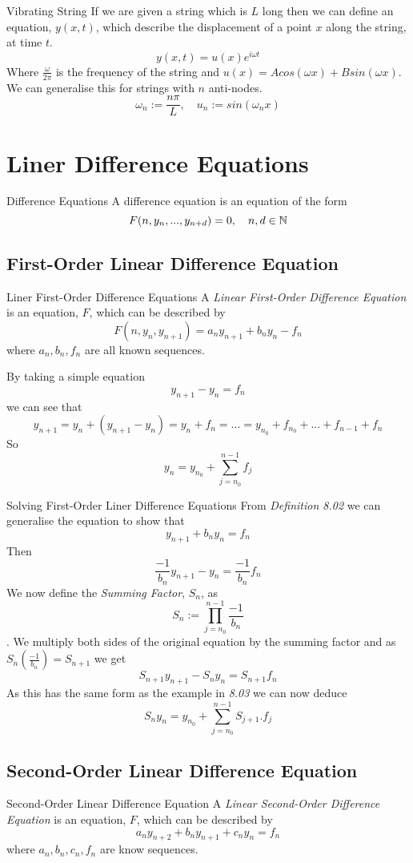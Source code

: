 \documentclass[11pt,a4paper]{article}
\begin{document}
\subtitle{Theorem 7.02 - }{Vibrating String}
If we are given a string which is $L$ long then we can define an equation, $y(x,t)$, which describe the displacement of a point $x$ along the string, at time $t$. $$y(x,t) = u(x)e^{i\omega t}$$
Where $\frac{\omega}{2\pi}$ is the frequency of the string and $u(x) = Acos(\omega x) + Bsin(\omega x)$. \\
We can generalise this for strings with $n$ anti-nodes. $$\omega_n := \frac{n\pi}{L},\quad u_n := sin(\omega_nx)$$

\section{Liner Difference Equations}
%
\subtitle{Definition 8.01 - }{Difference Equations}
A difference equation is an equation of the form $$F(n, y_n, ... , y_{n+d}) = 0,\quad n,d \in \mathbb{N}$$

\subsection{First-Order Linear Difference Equation}
\subtitle{Definition 8.02 - }{Liner First-Order Difference Equations}
A \textit{Linear First-Order Difference Equation} is an equation, $F$, which can be described by $$F(n, y_n, y_{n+1}) = a_ny_{n+1} + b_ny_n - f_n$$
where $a_n, b_n, f_n$ are all known sequences. \\

\subtitle{Example 8.03}{}
By taking a simple equation $$y_{n+1} - y_n = f_n$$
we can see that $$y_{n+1} = y_n +(y_{n+1} - y_n) = y_n + f_n = ... = y_{n_0} +f_{n_0} + ... + f_{n-1} + f_n$$
So $$y_n = y_{n_0} + \sum_{j = n_0}^{n-1} f_j$$

\subtitle{Theorem 8.04 - }{Solving First-Order Liner Difference Equations}
From \textit{Definition 8.02} we can generalise the equation to show that $$y_{n+1} + b_ny_n = f_n$$
Then $$\frac{-1}{b_n}y_{n+1}-y_n = \frac{-1}{b_n}f_n$$
We now define the \textit{Summing Factor}, $S_n$, as $$S_n :=\prod_{j={n_0}}^{n-1}\frac{-1}{b_n}$$.
We multiply both sides of the original equation by the summing factor and as $S_n(\frac{-1}{b_n})=S_{n+1}$ we get $$S_{n+1}y_{n+1} - S_ny_n = S_{n+1}f_n$$
As this has the same form as the example in \textit{8.03} we can now deduce $$S_ny_n = y_{n_0} + \sum_{j={n_0}}^{n-1}S_{j+1}.f_j$$

\subsection{Second-Order Linear Difference Equation}
%
\subtitle{Definition 8.05 - }{Second-Order Linear Difference Equation}
A \textit{Linear Second-Order Difference Equation} is an equation, $F$, which can be described by $$a_ny_{n+2} + b_ny_{n+1} +c_ny_n = f_n$$
where $a_n, b_n, c_n, f_n$ are know sequences. \\
\end{document}
